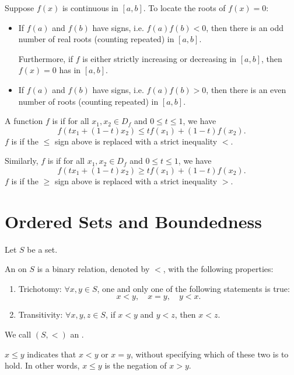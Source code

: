 Suppose $f(x)$ is continuous in $[a,b]$. To locate the roots of $f(x)=0$:
\begin{itemize}
\item If $f(a)$ and $f(b)$ have  signs, i.e. $f(a)f(b)<0$, then there is an odd number of real roots (counting repeated) in $[a,b]$.

Furthermore, if $f$ is either strictly increasing or decreasing in $[a,b]$, then $f(x)=0$ has  in $[a,b]$.

\item If $f(a)$ and $f(b)$ have  signs, i.e. $f(a)f(b)>0$, then there is an even number of roots (counting repeated) in $[a,b]$.
\end{itemize}

\begin{definition}[Convexity]
A function $f$ is  if for all $x_1,x_2\in D_f$ and $0\le t\le 1$, we have
\[ f(tx_1+(1-t)x_2)\le tf(x_1)+(1-t)f(x_2).\]
$f$ is  if the $\le$ sign above is replaced with a strict inequality $<$.

Similarly, $f$ is  if for all $x_1,x_2\in D_f$ and $0\le t\le 1$, we have
\[ f(tx_1+(1-t)x_2)\ge tf(x_1)+(1-t)f(x_2). \]
$f$ is  if the $\ge$ sign above is replaced with a strict inequality $>$.
\end{definition}
\pagebreak

\section{Ordered Sets and Boundedness}
Let $S$ be a set.
\begin{definition}[Order]
An  on $S$ is a binary relation, denoted by $<$, with the following properties:
\begin{enumerate}[label=(\roman*)]
\item Trichotomy: $\forall x,y \in S$, one and only one of the following statements is true:
\[x<y,\quad x=y,\quad y<x.\]
\item Transitivity: $\forall x,y,z \in S$, if $x<y$ and $y<z$, then $x<z$.
\end{enumerate}
We call $(S,<)$ an .
\end{definition}

\begin{notation}
$x \le y$ indicates that $x<y$ or $x=y$, without specifying which of these two is to hold. In other words, $x\le y$ is the negation of $x>y$.
\end{notation}

